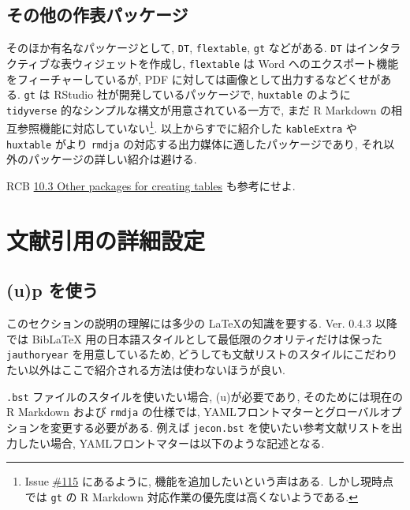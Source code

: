 \documentclass[
]{bxjsbook}
\newenvironment{infobox}[1]{\begin{itemize}\renewcommand{\labelitemi}{\raisebox{-.7\height}[0pt][0pt]{%
  {\setkeys{Gin}{width=3em,keepaspectratio}\texttt{[image: \_latex/\_img/\#1]}}}}
  \setlength{\fboxsep}{1em}
  \begin{greyblock}
  \item
  }{\end{greyblock}\end{itemize}
}
\newenvironment{caution}{\begin{infobox}{caution}}{\end{infobox}}
\theoremstyle{definition}
\theoremstyle{definition}
\theoremstyle{definition}
\theoremstyle{remark}
\begin{document}
\hypertarget{ux305dux306eux4ed6ux306eux4f5cux8868ux30d1ux30c3ux30b1ux30fcux30b8}{%
\section{その他の作表パッケージ}\label{ux305dux306eux4ed6ux306eux4f5cux8868ux30d1ux30c3ux30b1ux30fcux30b8}}

そのほか有名なパッケージとして, \texttt{DT}, \texttt{flextable},
\texttt{gt} などがある. \texttt{DT}
はインタラクティブな表ウィジェットを作成し, \texttt{flextable} は Word
へのエクスポート機能をフィーチャーしているが, PDF
に対しては画像として出力するなどくせがある. \texttt{gt} は RStudio
社が開発しているパッケージで, \texttt{huxtable} のように
\texttt{tidyverse} 的なシンプルな構文が用意されている一方で, まだ R
Markdown の相互参照機能に対応していない\footnote{Issue
  \href{https://github.com/rstudio/gt/issues/115}{\#115} にあるように,
  機能を追加したいという声はある. しかし現時点では \texttt{gt} の R
  Markdown 対応作業の優先度は高くないようである.}.
以上からすでに紹介した \texttt{kableExtra} や \texttt{huxtable} がより
\texttt{rmdja} の対応する出力媒体に適したパッケージであり,
それ以外のパッケージの詳しい紹介は避ける.

RCB
\href{https://bookdown.org/yihui/rmarkdown-cookbook/table-other.html}{10.3
Other packages for creating tables} も参考にせよ.

\hypertarget{biblio-advaneced}{%
\chapter{文献引用の詳細設定}\label{biblio-advaneced}}

\hypertarget{ux3092ux4f7fux3046}{%
\section{\texorpdfstring{(u)p\BibTeX
を使う}{ を使う}}\label{ux3092ux4f7fux3046}}

\begin{caution}
このセクションの説明の理解には多少の \LaTeX の知識を要する. Ver. 0.4.3
以降では BibLaTeX 用の日本語スタイルとして最低限のクオリティだけは保った
\texttt{jauthoryear} を用意しているため,
どうしても文献リストのスタイルにこだわりたい以外はここで紹介される方法は使わないほうが良い.
\end{caution}

\texttt{.bst} ファイルのスタイルを使いたい場合,
(u)\pBibTeX が必要であり, そのためには現在の R Markdown および
\texttt{rmdja} の仕様では,
YAMLフロントマターとグローバルオプションを変更する必要がある. 例えば
\texttt{jecon.bst} を使いたい参考文献リストを出力したい場合,
YAMLフロントマターは以下のような記述となる.
\end{document}
